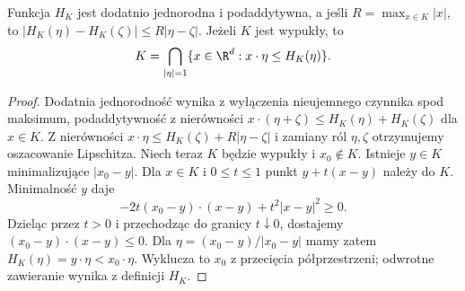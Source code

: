 \begin{stwierdzenie}
\label{prop:dt-support-function}
Funkcja $H_K$ jest dodatnio jednorodna i podaddytywna,
a jeśli $R=\max_{x\in K}|x|$, to
$|H_K(\eta)-H_K(\zeta)|\le R|\eta-\zeta|$.
Jeżeli $K$ jest wypukły, to
\[
 K=\bigcap_{|\eta|=1}\{x\in\R^d:x\cdot\eta\le H_K(\eta)\}.
\]
\end{stwierdzenie}
\begin{proof}
Dodatnia jednorodność wynika z wyłączenia nieujemnego
czynnika spod maksimum, podaddytywność z nierówności
$x\cdot(\eta+\zeta)\le H_K(\eta)+H_K(\zeta)$
dla $x\in K$. Z nierówności
$x\cdot\eta\le H_K(\zeta)+R|\eta-\zeta|$
i zamiany ról $\eta,\zeta$ otrzymujemy oszacowanie
Lipschitza.
Niech teraz $K$ będzie wypukły i $x_0\notin K$.
Istnieje $y\in K$ minimalizujące $|x_0-y|$.
Dla $x\in K$ i $0\le t\le1$ punkt
$y+t(x-y)$ należy do $K$. Minimalność $y$ daje
\[
 -2t(x_0-y)\cdot(x-y)+t^2|x-y|^2\ge0.
\]
Dzieląc przez $t>0$ i przechodząc do granicy $t\downarrow0$,
dostajemy $(x_0-y)\cdot(x-y)\le0$.
Dla $\eta=(x_0-y)/|x_0-y|$ mamy zatem
$H_K(\eta)=y\cdot\eta<x_0\cdot\eta$.
Wyklucza to $x_0$ z przecięcia półprzestrzeni;
odwrotne zawieranie wynika z definicji $H_K$.
\end{proof}

